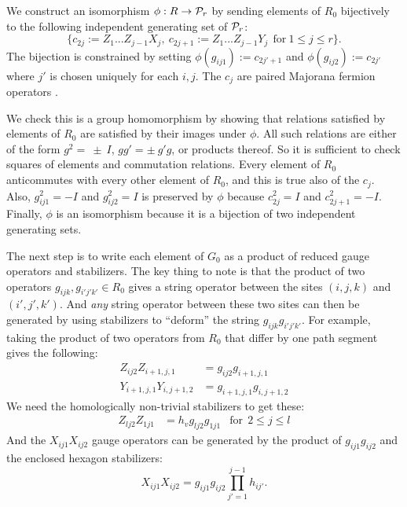 \documentclass[12pt]{article}
\begin{document}
We construct an isomorphism $\phi: R\to \mathcal{P}_r$
by sending elements of $R_0$ bijectively
to the following independent generating
set of $\mathcal{P}_r$:
$$
\big\{c_{2j}:=Z_1...Z_{j-1} X_j,\ c_{2j+1}:=Z_1...Z_{j-1} Y_j\ \ \mbox{for}\ 1\le j\le r\big\}.
$$
The bijection is constrained 
by setting $\phi(g_{ij1}):=c_{2j'+1}$
and $\phi(g_{ij2}):=c_{2j'}$
where $j'$ is chosen uniquely for each $i, j.$
The $c_j$ are paired Majorana fermion operators  \cite{Jordan1928, Kitaev2006}.


We check this is a group homomorphism by showing that relations
satisfied by elements of $R_0$ are satisfied by
their images under $\phi.$
All such relations are either of the form
$g^2=~\pm~I$, $gg'=\pm~g'g$, or
products thereof.
So it is sufficient to check squares of
elements and commutation relations.
Every element of $R_0$ anticommutes with
every other element of $R_0$, and this is true also
of the $c_j.$
Also, $g_{ij1}^2=-I$ and $g_{ij2}^2=I$ 
is preserved by $\phi$ because $c_{2j}^2=I$ and $c_{2j+1}^2=-I$.
Finally, $\phi$ is an isomorphism
because it is a bijection of two independent
generating sets.

The next step is to write each element of $G_0$
as a product of reduced gauge operators and stabilizers.
The key thing to note is that the product of two
operators $g_{ijk}, g_{i'j'k'}\in R_0$ gives a string
operator between the sites $(i,j,k)$ and $(i',j',k')$.
And {\it any} string operator between these
two sites can then be generated by using stabilizers to
``deform'' the string $g_{ijk}g_{i'j'k'}.$
For example, taking the product
of two operators from $R_0$ that differ
by one path segment gives the following:
\begin{align*}
Z_{ij2}Z_{i+1,j,1} &= g_{ij2} g_{i+1,j,1} \\
Y_{i+1,j,1}Y_{i,j+1,2} &= g_{i+1,j,1}g_{i,j+1,2}
\end{align*}
We need the homologically non-trivial stabilizers to get these:
\begin{align*}
Z_{lj2}Z_{1j1} &= h_v g_{lj2} g_{1j1} &\mbox{for}\ \  2\le j\le l
\end{align*}
And the $X_{ij1}X_{ij2}$
gauge operators can be generated
by the product of 
$g_{ij1}g_{ij2}$ and the enclosed hexagon stabilizers:
$$X_{ij1}X_{ij2}=g_{ij1}g_{ij2}\prod_{j'=1}^{j-1} h_{ij'}.$$
\end{document}
